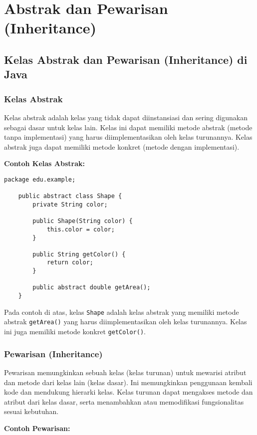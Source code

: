 \chapter{Abstrak dan Pewarisan (Inheritance)}

\section{Kelas Abstrak dan Pewarisan (Inheritance) di Java}

\subsection{Kelas Abstrak}

Kelas abstrak adalah kelas yang tidak dapat diinstansiasi dan sering digunakan sebagai dasar untuk kelas lain. Kelas ini dapat memiliki metode abstrak (metode tanpa implementasi) yang harus diimplementasikan oleh kelas turunannya. Kelas abstrak juga dapat memiliki metode konkret (metode dengan implementasi).

\textbf{Contoh Kelas Abstrak:}

\begin{lstlisting}[style=JavaStyle]
	package edu.example;
	
	public abstract class Shape {
		private String color;
		
		public Shape(String color) {
			this.color = color;
		}
		
		public String getColor() {
			return color;
		}
		
		public abstract double getArea();
	}
\end{lstlisting}

Pada contoh di atas, kelas \texttt{Shape} adalah kelas abstrak yang memiliki metode abstrak \texttt{getArea()} yang harus diimplementasikan oleh kelas turunannya. Kelas ini juga memiliki metode konkret \texttt{getColor()}.

\subsection{Pewarisan (Inheritance)}

Pewarisan memungkinkan sebuah kelas (kelas turunan) untuk mewarisi atribut dan metode dari kelas lain (kelas dasar). Ini memungkinkan penggunaan kembali kode dan mendukung hierarki kelas. Kelas turunan dapat mengakses metode dan atribut dari kelas dasar, serta menambahkan atau memodifikasi fungsionalitas sesuai kebutuhan.

\textbf{Contoh Pewarisan:}

